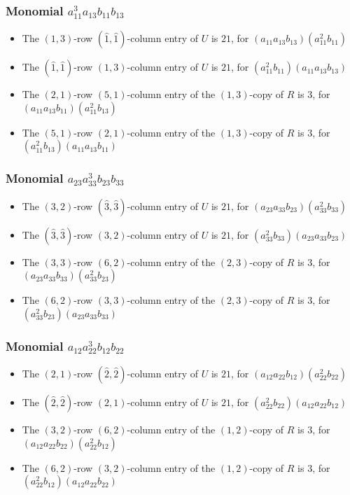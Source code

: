 \documentclass{article}
\begin{document}
\subsubsection{Monomial $ a_{11}^{3} a_{13} b_{11} b_{13} $}

\begin{itemize}
\item The $ \left(1, 3\right) $-row $ (\hat{1}, \hat{1}) $-column entry of $U$ is $ 21 $, for $( a_{11} a_{13} b_{13} )( a_{11}^{2} b_{11} )$ 
\item The $(\hat{1}, \hat{1})$-row $ \left(1, 3\right) $-column entry of $U$ is $ 21 $, for $( a_{11}^{2} b_{11} )( a_{11} a_{13} b_{13} )$ 
\item The $(2, 1)$-row $(5, 1)$-column entry of the $ \left(1, 3\right) $-copy of $R$ is $ 3 $, for $( a_{11} a_{13} b_{11} )( a_{11}^{2} b_{13} )$ 
\item The $(5, 1)$-row $(2, 1)$-column entry of the $ \left(1, 3\right) $-copy of $R$ is $ 3 $, for $( a_{11}^{2} b_{13} )( a_{11} a_{13} b_{11} )$ 
\end{itemize}
\subsubsection{Monomial $ a_{23} a_{33}^{3} b_{23} b_{33} $}

\begin{itemize}
\item The $ \left(3, 2\right) $-row $ (\hat{3}, \hat{3}) $-column entry of $U$ is $ 21 $, for $( a_{23} a_{33} b_{23} )( a_{33}^{2} b_{33} )$ 
\item The $(\hat{3}, \hat{3})$-row $ \left(3, 2\right) $-column entry of $U$ is $ 21 $, for $( a_{33}^{2} b_{33} )( a_{23} a_{33} b_{23} )$ 
\item The $(3, 3)$-row $(6, 2)$-column entry of the $ \left(2, 3\right) $-copy of $R$ is $ 3 $, for $( a_{23} a_{33} b_{33} )( a_{33}^{2} b_{23} )$ 
\item The $(6, 2)$-row $(3, 3)$-column entry of the $ \left(2, 3\right) $-copy of $R$ is $ 3 $, for $( a_{33}^{2} b_{23} )( a_{23} a_{33} b_{33} )$ 
\end{itemize}
\subsubsection{Monomial $ a_{12} a_{22}^{3} b_{12} b_{22} $}

\begin{itemize}
\item The $ \left(2, 1\right) $-row $ (\hat{2}, \hat{2}) $-column entry of $U$ is $ 21 $, for $( a_{12} a_{22} b_{12} )( a_{22}^{2} b_{22} )$ 
\item The $(\hat{2}, \hat{2})$-row $ \left(2, 1\right) $-column entry of $U$ is $ 21 $, for $( a_{22}^{2} b_{22} )( a_{12} a_{22} b_{12} )$ 
\item The $(3, 2)$-row $(6, 2)$-column entry of the $ \left(1, 2\right) $-copy of $R$ is $ 3 $, for $( a_{12} a_{22} b_{22} )( a_{22}^{2} b_{12} )$ 
\item The $(6, 2)$-row $(3, 2)$-column entry of the $ \left(1, 2\right) $-copy of $R$ is $ 3 $, for $( a_{22}^{2} b_{12} )( a_{12} a_{22} b_{22} )$ 
\end{itemize}
\end{document}
